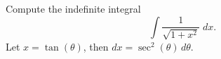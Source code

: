 \documentclass{ximera}
\begin{document}
\begin{example}
Compute the indefinite integral
\[
\int\frac{1}{\sqrt{1+x^2}}\; dx.
\]
Let $x = \tan(\theta)$, then $dx = \sec^2(\theta) \, d\theta$.
\end{example}





\begin{center}
\begin{foldable}
\end{foldable}
\end{center}
\end{document}
